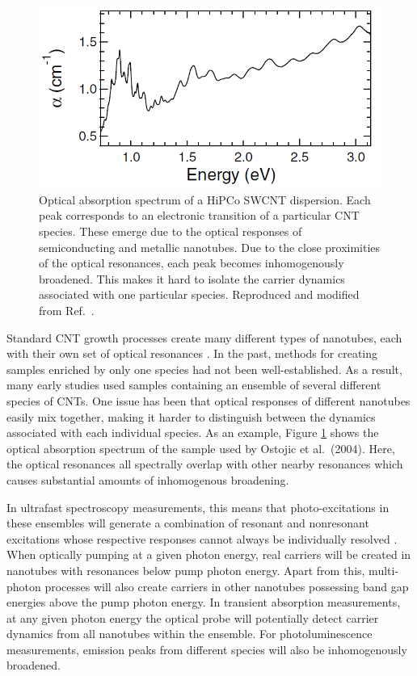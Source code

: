 \begin{figure}[ht]
	\centering
	\includegraphics[scale=0.7]{images/chapter_intro/abs_gordana_modified}
	\caption{Optical absorption spectrum of a HiPCo SWCNT dispersion. Each peak corresponds to an electronic transition of a particular CNT species. These emerge due to the optical responses of semiconducting and metallic nanotubes. Due to the close proximities of the optical resonances, each peak becomes inhomogenously broadened. This makes it hard to isolate the carrier dynamics associated with one particular species. Reproduced and modified from Ref.\ \cite{ostojic2004interband}.}
	\label{fig:abs_gordana_intro}
\end{figure}


Standard CNT growth processes create many different types of nanotubes, each with their own set of optical resonances \cite{prasek2011methods}. In the past, methods for creating samples enriched by only one species had not been well-established. As a result, many early studies used samples containing an ensemble of several different species of CNTs. One issue has been that optical responses of different nanotubes easily mix together, making it harder to distinguish between the dynamics associated with each individual species. As an example, Figure \ref{fig:abs_gordana_intro} shows the optical absorption spectrum of the sample used by Ostojic et al.\ (2004). Here, the optical resonances all spectrally overlap with other nearby resonances which causes substantial amounts of inhomogenous broadening.

In ultrafast spectroscopy measurements, this means that photo-excitations in these ensembles will generate a combination of resonant and nonresonant excitations whose respective responses cannot always be individually resolved \cite{ostojic2004interband}. When optically pumping at a given photon energy, real carriers will be created in nanotubes with resonances below pump photon energy. Apart from this, multi-photon processes will also create carriers in other nanotubes possessing band gap energies above the pump photon energy. In transient absorption measurements, at any given photon energy the optical probe will potentially detect carrier dynamics from all nanotubes within the ensemble. For photoluminescence measurements, emission peaks from different species will also be inhomogenously broadened.

